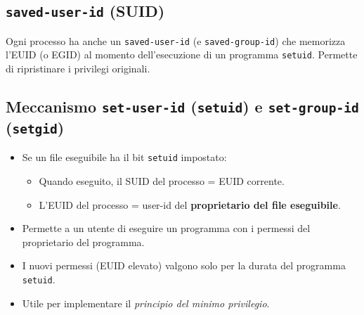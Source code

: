 \documentclass{article}
\begin{document}
\subsection{\texttt{saved-user-id} (SUID)}
Ogni processo ha anche un \texttt{saved-user-id} (e \texttt{saved-group-id}) che memorizza l'EUID (o EGID) al momento dell'esecuzione di un programma \texttt{setuid}. Permette di ripristinare i privilegi originali.

\subsection{Meccanismo \texttt{set-user-id} (\texttt{setuid}) e \texttt{set-group-id} (\texttt{setgid})}
\begin{itemize}
    \item Se un file eseguibile ha il bit \texttt{setuid} impostato:
    \begin{itemize}
        \item Quando eseguito, il SUID del processo = EUID corrente.
        \item L'EUID del processo = user-id del \textbf{proprietario del file eseguibile}.
    \end{itemize}
    \item Permette a un utente di eseguire un programma con i permessi del proprietario del programma.
    \item I nuovi permessi (EUID elevato) valgono solo per la durata del programma \texttt{setuid}.
    \item Utile per implementare il \textit{principio del minimo privilegio}.
\end{itemize}
\end{document}
